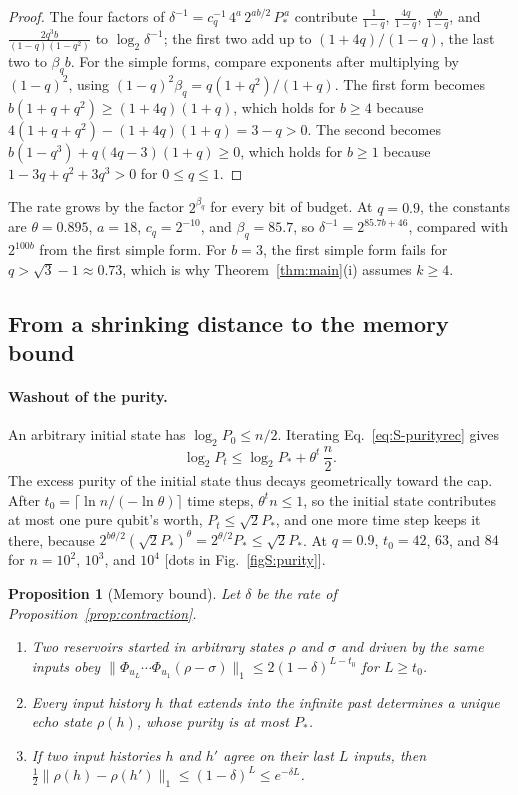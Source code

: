 \documentclass[aps,prl,twocolumn,superscriptaddress,floatfix]{revtex4-2}
\theoremstyle{plain}
\newtheorem{proposition}[lemma]{Proposition}
\newcommand{\Norm}[1]{\lVert #1\rVert}
\begin{document}
\begin{proof}
The four factors of $\delta^{-1}=c_q^{-1}\,4^{a}\,2^{ab/2}\,P_*^{\,a}$ contribute $\frac1{1-q}$, $\frac{4q}{1-q}$, $\frac{qb}{1-q}$, and $\frac{2q^3b}{(1-q)(1-q^2)}$ to $\log_2\delta^{-1}$; the first two add up to $(1+4q)/(1-q)$, the last two to $\beta_qb$. For the simple forms, compare exponents after multiplying by $(1-q)^2$, using $(1-q)^2\beta_q=q(1+q^2)/(1+q)$. The first form becomes $b(1+q+q^2)\ge(1+4q)(1+q)$, which holds for $b\ge4$ because $4(1+q+q^2)-(1+4q)(1+q)=3-q>0$. The second becomes $b(1-q^3)+q(4q-3)(1+q)\ge0$, which holds for $b\ge1$ because $1-3q+q^2+3q^3>0$ for $0\le q\le1$.
\end{proof}

The rate grows by the factor $2^{\beta_q}$ for every bit of budget. At $q=0.9$, the constants are $\theta=0.895$, $a=18$, $c_q=2^{-10}$, and $\beta_q=85.7$, so $\delta^{-1}=2^{85.7b+46}$, compared with $2^{100b}$ from the first simple form. For $b=3$, the first simple form fails for $q>\sqrt3-1\approx0.73$, which is why Theorem~\ref{thm:main}(i) assumes $k\ge4$.

\subsection{From a shrinking distance to the memory bound}
\label{sm:memory}

\paragraph*{Washout of the purity.} An arbitrary initial state has $\log_2P_0\le n/2$. Iterating Eq.~\eqref{eq:S-purityrec} gives
\begin{equation}
\log_2P_t\le\log_2P_*+\theta^t\,\frac n2 .
\label{eq:S-washout}
\end{equation}
The excess purity of the initial state thus decays geometrically toward the cap. After $t_0=\lceil\ln n/(-\ln\theta)\rceil$ time steps, $\theta^tn\le1$, so the initial state contributes at most one pure qubit's worth, $P_t\le\sqrt2P_*$, and one more time step keeps it there, because $2^{b\theta/2}(\sqrt2P_*)^\theta=2^{\theta/2}P_*\le\sqrt2P_*$. At $q=0.9$, $t_0=42$, $63$, and $84$ for $n=10^2$, $10^3$, and $10^4$ [dots in Fig.~\ref{figS:purity}].

\begin{proposition}[Memory bound]\label{prop:echo}
Let $\delta$ be the rate of Proposition~\ref{prop:contraction}.
\begin{enumerate}
\item[(a)] Two reservoirs started in arbitrary states $\rho$ and $\sigma$ and driven by the same inputs obey $\Norm{\Phi_{u_L}\cdots\Phi_{u_1}(\rho-\sigma)}_1\le2(1-\delta)^{L-t_0}$ for $L\ge t_0$.
\item[(b)] Every input history $h$ that extends into the infinite past determines a unique echo state $\rho(h)$, whose purity is at most $P_*$.
\item[(c)] If two input histories $h$ and $h'$ agree on their last $L$ inputs, then $\frac12\Norm{\rho(h)-\rho(h')}_1\le(1-\delta)^L\le e^{-\delta L}$.
\end{enumerate}
\end{proposition}
\end{document}
